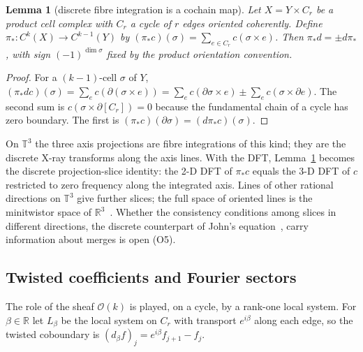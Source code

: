\documentclass[10pt]{article}
\newtheorem{lemma}[thm]{Lemma}
\theoremstyle{definition}
\newcommand{\R}{\mathbb R}\newcommand{\Z}{\mathbb Z}\newcommand{\C}{\mathbb C}
\newcommand{\Tor}{\mathbb T}\newcommand{\PT}{\mathbb{PT}}\newcommand{\CP}{\mathbb{CP}}
\newcommand{\cO}{\mathcal O}\newcommand{\cH}{\mathcal H}
\begin{document}
\begin{lemma}[discrete fibre integration is a cochain map]\label{l:fibre}
Let $X=Y\times C_r$ be a product cell complex with $C_r$ a cycle of $r$ edges oriented coherently. Define $\pi_*:C^k(X)\to C^{k-1}(Y)$ by $(\pi_*c)(\sigma)=\sum_{e\in C_r}c(\sigma\times e)$. Then $\pi_*d=\pm d\pi_*$, with sign $(-1)^{\dim\sigma}$ fixed by the product orientation convention.
\end{lemma}
\begin{proof}
For a $(k-1)$-cell $\sigma$ of $Y$, $(\pi_*dc)(\sigma)=\sum_e c(\partial(\sigma\times e))=\sum_e c(\partial\sigma\times e)\pm\sum_e c(\sigma\times\partial e)$. The second sum is $c(\sigma\times\partial[C_r])=0$ because the fundamental chain of a cycle has zero boundary. The first is $(\pi_*c)(\partial\sigma)=(d\pi_*c)(\sigma)$.
\end{proof}

On $\Tor^3$ the three axis projections are fibre integrations of this kind; they are the discrete X-ray transforms along the axis lines. With the DFT, Lemma~\ref{l:fibre} becomes the discrete projection-slice identity: the 2-D DFT of $\pi_*c$ equals the 3-D DFT of $c$ restricted to zero frequency along the integrated axis. Lines of other rational directions on $\Tor^3$ give further slices; the full space of oriented lines is the minitwistor space of $\R^3$~\cite{hitchin82}. Whether the consistency conditions among slices in different directions, the discrete counterpart of John's equation~\cite{john38}, carry information about merges is open (O5).

\subsection{Twisted coefficients and Fourier sectors}
The role of the sheaf $\cO(k)$ is played, on a cycle, by a rank-one local system. For $\beta\in\R$ let $L_\beta$ be the local system on $C_r$ with transport $e^{i\beta}$ along each edge, so the twisted coboundary is $(d_\beta f)_j=e^{i\beta}f_{j+1}-f_j$.
\end{document}
